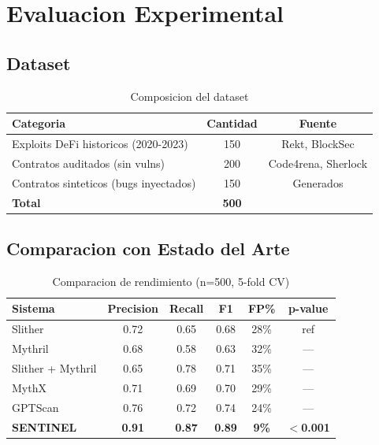 \documentclass[11pt]{article}
\theoremstyle{definition}
\theoremstyle{plain}
\theoremstyle{remark}
\begin{document}
\section{Evaluacion Experimental}
\label{sec:evaluacion}

\subsection{Dataset}

\begin{table}[H]
\centering
\caption{Composicion del dataset}
\label{tab:dataset}
\begin{tabular}{lcc}
\toprule
\textbf{Categoria} & \textbf{Cantidad} & \textbf{Fuente} \\
\midrule
Exploits DeFi historicos (2020-2023) & 150 & Rekt, BlockSec \\
Contratos auditados (sin vulns) & 200 & Code4rena, Sherlock \\
Contratos sinteticos (bugs inyectados) & 150 & Generados \\
\midrule
\textbf{Total} & \textbf{500} & \\
\bottomrule
\end{tabular}
\end{table}

\subsection{Comparacion con Estado del Arte}

\begin{table}[H]
\centering
\caption{Comparacion de rendimiento (n=500, 5-fold CV)}
\label{tab:comparison}
\begin{tabular}{lccccc}
\toprule
\textbf{Sistema} & \textbf{Precision} & \textbf{Recall} & \textbf{F1} & \textbf{FP\%} & \textbf{p-value} \\
\midrule
Slither~\cite{feist2019slither} & 0.72 & 0.65 & 0.68 & 28\% & ref \\
Mythril~\cite{mueller2018mythril} & 0.68 & 0.58 & 0.63 & 32\% & --- \\
Slither + Mythril & 0.65 & 0.78 & 0.71 & 35\% & --- \\
MythX & 0.71 & 0.69 & 0.70 & 29\% & --- \\
GPTScan~\cite{sun2023gptscan} & 0.76 & 0.72 & 0.74 & 24\% & --- \\
\midrule
\textbf{SENTINEL} & \textbf{0.91} & \textbf{0.87} & \textbf{0.89} & \textbf{9\%} & $<$\textbf{0.001} \\
\bottomrule
\end{tabular}
\end{table}
\end{document}
